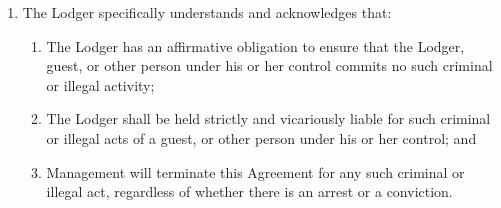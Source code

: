 \documentclass[12pt,letterpaper]{article}
\newcommand{\lodger}{Lodger}
\newcommand{\management}{Management}
\begin{document}
\begin{enumerate}
\begin{enumerate}
\begin{enumerate}
\begin{enumerate}
							\end{enumerate} 
						\item The \lodger{} specifically understands and acknowledges that: 
							\begin{enumerate} 
								\item	The \lodger{} has an affirmative obligation to ensure that the \lodger{}, guest, or other person under his or her control commits no such criminal or illegal activity; 
								\item The \lodger{} shall be held strictly and vicariously liable for such criminal or illegal acts of a guest, or other person under his or her control; and 
								\item \management{} will terminate this Agreement for any such criminal or illegal act, regardless of whether there is an arrest or a conviction. 
							\end{enumerate}
							

\end{enumerate}
\end{enumerate}
\end{enumerate}
\end{document}
